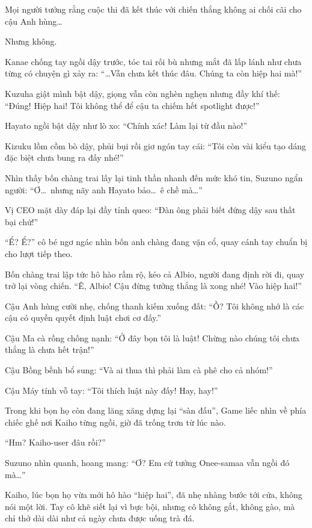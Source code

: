 \documentclass[../main.tex]{subfiles}
\begin{document}
Mọi người tưởng rằng cuộc thi đã kết thúc với chiến thắng không ai chối cãi cho cậu Anh hùng\dots

Nhưng không.

Kanae chống tay ngồi dậy trước, tóc tai rối bù nhưng mắt đã lấp lánh như chưa từng có chuyện gì xảy ra: ``\dots Vẫn chưa kết thúc đâu. Chúng ta còn hiệp hai mà!''

Kuzuha giật mình bật dậy, giọng vẫn còn nghèn nghẹn nhưng đầy khí thế: ``Đúng! Hiệp hai! Tôi không thể để cậu ta chiếm hết spotlight được!''

Hayato ngồi bật dậy như lò xo: ``Chính xác! Làm lại từ đầu nào!''

Kizuku lồm cồm bò dậy, phủi bụi rồi giơ ngón tay cái: ``Tôi còn vài kiểu tạo dáng đặc biệt chưa bung ra đấy nhé!''

Nhìn thấy bốn chàng trai lấy lại tinh thần nhanh đến mức khó tin, Suzuno ngẩn người: ``Ơ\dots\ nhưng nãy anh Hayato bảo\dots\ ê chề mà\dots''

Vị CEO mặt dày đáp lại đầy tỉnh queo: ``Đàn ông phải biết đứng dậy sau thất bại chứ!''

``Ể? Ể?'' cô bé ngơ ngác nhìn bốn anh chàng đang vặn cổ, quay cánh tay chuẩn bị cho lượt tiếp theo.

Bốn chàng trai lập tức hô hào rầm rộ, kéo cả Albio, người đang định rời đi, quay trở lại vòng chiến. ``Ê, Albio! Cậu đừng tưởng thắng là xong nhé! Vào hiệp hai!''

Cậu Anh hùng cười nhẹ, chống thanh kiếm xuống đất: ``Ồ? Tôi không nhớ là các cậu có quyền quyết định luật chơi cơ đấy.''

Cậu Ma cà rồng chống nạnh: ``Ở đây bọn tôi là luật! Chừng nào chúng tôi chưa thắng là chưa hết trận!''

Cậu Bồng bềnh bổ sung: ``Và ai thua thì phải làm cà phê cho cả nhóm!''

Cậu Máy tính vỗ tay: ``Tôi thích luật này đấy! Hay, hay!''

Trong khi bọn họ còn đang lăng xăng dựng lại ``sàn đấu'', Game liếc nhìn về phía chiếc ghế nơi Kaiho từng ngồi, giờ đã trống trơn từ lúc nào.

``Hm? Kaiho-user đâu rồi?''

Suzuno nhìn quanh, hoang mang: ``Ơ? Em cứ tưởng Onee-samaa vẫn ngồi đó mà\dots''

\il

Kaiho, lúc bọn họ vừa mới hô hào ``hiệp hai'', đã nhẹ nhàng bước tới cửa, không nói một lời. Tay cô khẽ siết lại vì bực bội, nhưng cô không gắt, không gào, mà chỉ thở dài dài như cả ngày chưa được uống trà đá.
\end{document}
